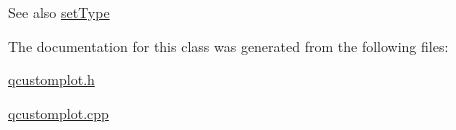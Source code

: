 \begin{DoxySeeAlso}{See also}
\hyperlink{classQCPItemPosition_aa476abf71ed8fa4c537457ebb1a754ad}{set\+Type} 
\end{DoxySeeAlso}


The documentation for this class was generated from the following files\+:\begin{DoxyCompactItemize}
\item 
\hyperlink{qcustomplot_8h}{qcustomplot.\+h}\item 
\hyperlink{qcustomplot_8cpp}{qcustomplot.\+cpp}\end{DoxyCompactItemize}

